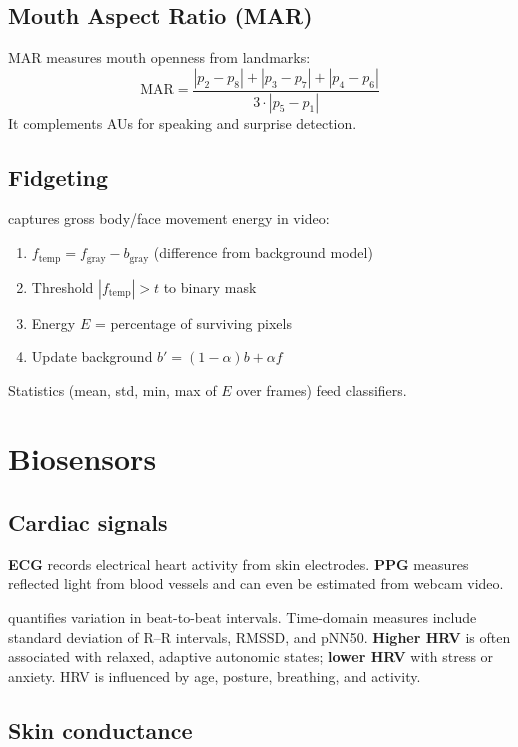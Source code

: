 \subsection{Mouth Aspect Ratio (MAR)}

MAR measures mouth openness from landmarks:
\[
\mathrm{MAR} = \frac{|p_2-p_8| + |p_3-p_7| + |p_4-p_6|}{3 \cdot |p_5-p_1|}
\]
It complements AUs for speaking and surprise detection.

\subsection{Fidgeting}

 captures gross body/face movement energy in video:
\begin{enumerate}
  \item $f_{\mathrm{temp}} = f_{\mathrm{gray}} - b_{\mathrm{gray}}$ (difference from background model)
  \item Threshold $|f_{\mathrm{temp}}| > t$ to binary mask
  \item Energy $E$ = percentage of surviving pixels
  \item Update background $b' = (1-\alpha)b + \alpha f$
\end{enumerate}
Statistics (mean, std, min, max of $E$ over frames) feed classifiers.

\section{Biosensors}

\subsection{Cardiac signals}

\textbf{ECG} records electrical heart activity from skin electrodes. \textbf{PPG} measures reflected light from blood vessels and can even be estimated from webcam video.

 quantifies variation in beat-to-beat intervals. Time-domain measures include standard deviation of R--R intervals, RMSSD, and pNN50. \textbf{Higher HRV} is often associated with relaxed, adaptive autonomic states; \textbf{lower HRV} with stress or anxiety. HRV is influenced by age, posture, breathing, and activity.

\subsection{Skin conductance}

